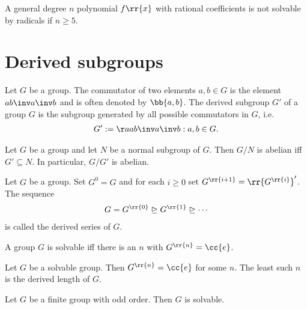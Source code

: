\documentclass{article}
\begin{document}
\begin{theorem}
  A general degree $n$ polynomial $f\rr{x}$ with rational coefficients is not solvable
  by radicals if $n\geq 5$.
\end{theorem}

\section{Derived subgroups}

\begin{definition}
  Let $G$ be a group. The commutator of two elements $a,b\in G$ is the element $ab\inv a\inv b$
  and is often denoted by $\bb{a,b}$. The derived subgroup $G'$ of a group $G$ is the
  subgroup generated by all possible commutators in $G$, i.e.
  \begin{align*}
    G':=\aa{ab\inv a\inv b : a,b\in G}.
  \end{align*}
\end{definition}

\begin{theorem}
  Let $G$ be a group and let $N$ be a normal subgroup of $G$. Then $G/N$ is abelian iff
  $G'\subseteq N$. In particular, $G/G'$ is abelian.
\end{theorem}

\begin{definition}
  Let $G$ be a group. Set $G^0=G$ and for each $i\geq 0$ set $G^{\rr{i+1}}=\rr{G^{\rr{i}}}'$.
  The sequence
  \begin{align*}
    G=G^{\rr{0}}\trianglerighteq G^{\rr{1}}\trianglerighteq \cdots
  \end{align*}
  is called the derived series of $G$.
\end{definition}

\begin{theorem}
  A group $G$ is solvable iff there is an $n$ with $G^{\rr{n}}=\cc{e}$.
\end{theorem}

\begin{definition}
  Let $G$ be a solvable group. Then $G^{\rr{n}}=\cc{e}$ for some $n$. The least such
  $n$ is the derived length of $G$.
\end{definition}

\begin{theorem}
  Let $G$ be a finite group with odd order. Then $G$ is solvable.
\end{theorem}
\end{document}
